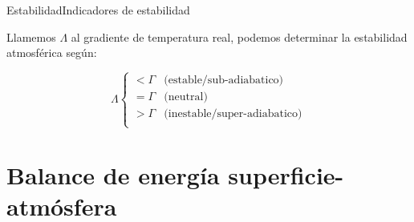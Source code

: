 \begin{frame}{Estabilidad}{Indicadores de estabilidad}
    
    Llamemos $\Lambda$ al \alert{gradiente de temperatura real}, podemos determinar la estabilidad atmosférica según:
    
    $$\Lambda \begin{cases}
        <\Gamma & \text{(estable/sub-adiabatico)}\\
        =\Gamma & \text{(neutral)} \\
        >\Gamma & \text{(inestable/super-adiabatico)} \\
    \end{cases}$$


    
\end{frame}
  
  

\section{Balance de energía superficie-atmósfera}
 
